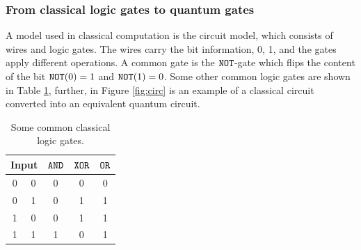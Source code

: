 \subsubsection{From classical logic gates to quantum gates}
A model used in classical computation is the circuit model, which consists of wires and logic gates. The wires carry the bit information, 0, 1, and the gates apply different operations. A common gate is the ${\tt NOT}$-gate which flips the content of the bit ${\tt NOT}(0) = 1$ and ${\tt NOT}(1) = 0$. Some other common logic gates are shown in Table \ref{tab:gates}, further, in Figure \ref{fig:circ} is an example of a classical circuit converted into an equivalent quantum circuit.  

\begin{table}[h]
    \centering
    \begin{tabular}{|c|c|c|c|c|}
    \hline
    \multicolumn{2}{|c|}{Input} & ${\tt AND}$ & ${\tt XOR}$ & ${\tt OR}$\\
    \hline
    0 & 0 & 0& 0& 0\\
    0 & 1 & 0& 1& 1\\
    1 & 0 & 0& 1& 1\\
    1 & 1 & 1& 0& 1\\
    \hline
    \end{tabular}
    \caption{Some common classical logic gates.}
    \label{tab:gates}
\end{table}


